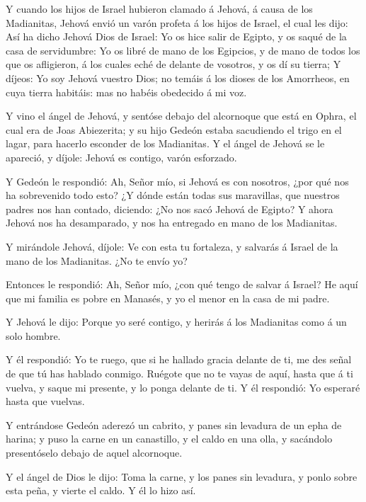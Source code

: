  Y cuando los hijos de Israel hubieron clamado á Jehová, á
causa de los Madianitas,  Jehová envió un varón profeta á
los hijos de Israel, el cual les dijo: Así ha dicho Jehová Dios de
Israel: Yo os hice salir de Egipto, y os saqué de la casa de
servidumbre:  Yo os libré de mano de los Egipcios, y de mano
de todos los que os afligieron, á los cuales eché de delante de
vosotros, y os dí su tierra;  Y díjeos: Yo soy Jehová
vuestro Dios; no temáis á los dioses de los Amorrheos, en cuya tierra
habitáis: mas no habéis obedecido á mi voz.

 Y vino el ángel de Jehová, y sentóse debajo del alcornoque
que está en Ophra, el cual era de Joas Abiezerita; y su hijo Gedeón
estaba sacudiendo el trigo en el lagar, para hacerlo esconder de los
Madianitas.  Y el ángel de Jehová se le apareció, y díjole:
Jehová es contigo, varón esforzado.

 Y Gedeón le respondió: Ah, Señor mío, si Jehová es con
nosotros, ¿por qué nos ha sobrevenido todo esto? ¿Y dónde están todas
sus maravillas, que nuestros padres nos han contado, diciendo: ¿No nos
sacó Jehová de Egipto? Y ahora Jehová nos ha desamparado, y nos ha
entregado en mano de los Madianitas.

 Y mirándole Jehová, díjole: Ve con esta tu fortaleza, y
salvarás á Israel de la mano de los Madianitas. ¿No te envío yo?

 Entonces le respondió: Ah, Señor mío, ¿con qué tengo de
salvar á Israel? He aquí que mi familia es pobre en Manasés, y yo el
menor en la casa de mi padre.

 Y Jehová le dijo: Porque yo seré contigo, y herirás á los
Madianitas como á un solo hombre.

 Y él respondió: Yo te ruego, que si he hallado gracia
delante de ti, me des señal de que tú has hablado conmigo. 
Ruégote que no te vayas de aquí, hasta que á ti vuelva, y saque mi
presente, y lo ponga delante de ti. Y él respondió: Yo esperaré hasta
que vuelvas.

 Y entrándose Gedeón aderezó un cabrito, y panes sin
levadura de un epha de harina; y puso la carne en un canastillo, y el
caldo en una olla, y sacándolo presentóselo debajo de aquel alcornoque.

 Y el ángel de Dios le dijo: Toma la carne, y los panes sin
levadura, y ponlo sobre esta peña, y vierte el caldo. Y él lo hizo así.


